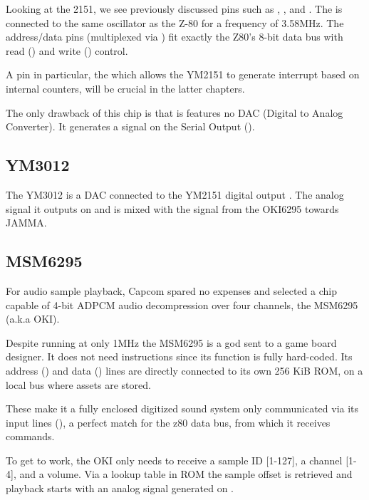 Looking at the 2151, we see previously discussed pins such as , , and . The  is connected to the same oscillator as the Z-80 for a frequency of 3.58MHz. The  address/data pins (multiplexed via ) fit exactly the Z80's 8-bit data bus with read () and write () control.


A pin in particular, the  which allows the YM2151 to generate interrupt based on internal counters, will be crucial in the latter chapters.


The only drawback of this chip is that is features no DAC (Digital to Analog Converter). It generates a signal on the Serial Output (). 

\subsection{YM3012}

The YM3012 is a DAC connected to the YM2151 digital output . The analog signal it outputs on  and  is mixed with the signal from the OKI6295 towards JAMMA.



\subsection{MSM6295}

For audio sample playback, Capcom spared no expenses and selected a chip capable of 4-bit ADPCM audio decompression over four channels, the MSM6295 (a.k.a OKI). 

Despite running at only 1MHz the MSM6295 is a god sent to a game board designer. It does not need instructions since its function is fully hard-coded. Its address () and data () lines are directly connected to its own 256 KiB ROM, on a local bus where assets are stored. 

These make it a fully enclosed digitized sound system only communicated via its input lines (), a perfect match for the z80 data bus, from which it receives commands.

To get to work, the OKI only needs to receive a sample ID [1-127], a channel [1-4], and a volume. Via a lookup table in ROM the sample offset is retrieved and playback starts with an analog signal generated on . 

